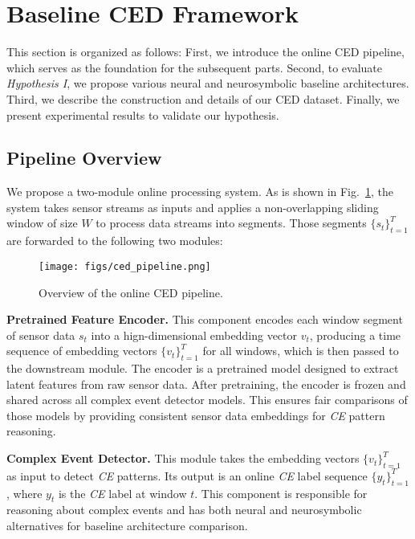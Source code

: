 \section{Baseline CED Framework}
This section is organized as follows: First, we introduce the online CED pipeline, which serves as the foundation for the subsequent parts. Second, to evaluate \emph{Hypothesis I}, we propose various neural and neurosymbolic baseline architectures. Third, we describe the construction and details of our CED dataset. Finally, we present experimental results to validate our hypothesis.

\subsection{Pipeline Overview}
We propose a two-module online processing system. As is shown in Fig.~\ref{fig:ced-pipeline}, the system takes sensor streams as inputs and applies a non-overlapping sliding window of size $W$ to process data streams into segments. Those segments $\{s_t\}_{t=1}^T$ are forwarded to the following two modules:

\begin{figure}[tb]
    \centering
        \setlength{\abovecaptionskip}{0.cm}
    \setlength{\belowcaptionskip}{0.cm}
    \texttt{[image: figs/ced\_pipeline.png]}
    \caption{Overview of the online CED pipeline.}
    \label{fig:ced-pipeline}
    \vspace{-1em}
\end{figure}

\textbf{Pretrained Feature Encoder.}
This component encodes each window segment of sensor data $s_t$ into a hign-dimensional embedding vector $v_t$, producing a time sequence of embedding vectors $\{v_t\}_{t=1}^T$ for all windows, which is then passed to the downstream module. The encoder is a pretrained model designed to extract latent features from raw sensor data. After pretraining, the encoder is frozen and shared across all complex event detector models. This ensures fair comparisons of those models by providing consistent sensor data embeddings for \emph{CE} pattern reasoning.

\textbf{Complex Event Detector.}  
This module takes the embedding vectors \(\{v_t\}_{t=1}^T\) as input to detect \emph{CE} patterns. Its output is an online \emph{CE} label sequence \(\{y_t\}_{t=1}^T\), where \(y_t\) is the \emph{CE} label at window \(t\). This component is responsible for reasoning about complex events and has both neural and neurosymbolic alternatives for baseline architecture comparison.

